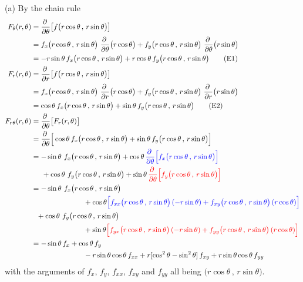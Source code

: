 \begin{solution}
(a) By the chain rule
\begin{align*}
F_\theta(r,\theta)
&=\pdiff{}{\theta}\big[f\big(r\cos\theta\,,\,r\sin\theta\big)\big] \\
&= f_x\big(r\cos\theta\,,\,r\sin\theta\big)
           \ \pdiff{}{\theta}\big(r\cos\theta\big)
  +f_y\big(r\cos\theta\,,\,r\sin\theta\big)
           \ \pdiff{}{\theta}\big(r\sin\theta\big)
   \\
&=-r\sin\theta\, f_x\big(r\cos\theta\,,\,r\sin\theta\big)
  +r\cos\theta\, f_y\big(r\cos\theta\,,\,r\sin\theta\big) 
\tag{E1}\\ %
F_r(r,\theta)
&=\pdiff{}{r}\big[f\big(r\cos\theta\,,\,r\sin\theta\big)\big] \\
&= f_x\big(r\cos\theta\,,\,r\sin\theta\big)
           \ \pdiff{}{r}\big(r\cos\theta\big)
  +f_y\big(r\cos\theta\,,\,r\sin\theta\big)
           \ \pdiff{}{r}\big(r\sin\theta\big)
   \\
&= \cos\theta\, f_x\big(r\cos\theta\,,\,r\sin\theta\big)
  +\sin\theta\, f_y\big(r\cos\theta\,,\,r\sin\theta\big) 
\tag{E2}\\ %
F_{r\theta}(r,\theta) &= \pdiff{}{\theta}\big[F_r(r,\theta)\big] \\
&=\pdiff{}{\theta}\Big[\cos\theta\, f_x\big(r\cos\theta\,,\,r\sin\theta\big)
  +\sin\theta\, f_y\big(r\cos\theta\,,\,r\sin\theta\big)\Big] \\
&=-\sin\theta\  f_x\big(r\cos\theta\,,\,r\sin\theta\big)
  +\cos\theta\, \textcolor{blue}{
          \pdiff{}{\theta} \Big[f_x\big(r\cos\theta\,,\,r\sin\theta\big)\Big]}
   \\&\hskip0.2in
  +\cos\theta\  f_y\big(r\cos\theta\,,\,r\sin\theta\big)
  +\sin\theta\,  \textcolor{red}{ 
       \pdiff{}{\theta}\Big[f_y\big(r\cos\theta\,,\,r\sin\theta\big)\Big]} \\
&=-\sin\theta\  f_x\big(r\cos\theta\,,\,r\sin\theta\big) \\&\hskip1in
    +\cos\theta \textcolor{blue}{
          \Big[f_{xx}\big(r\cos\theta\,,\,r\sin\theta\big)\,(-r\sin\theta)
              +f_{xy}\big(r\cos\theta\,,\,r\sin\theta\big)\,(r\cos\theta)\Big]}
          \\&\hskip0.1in
  +\cos\theta\  f_y\big(r\cos\theta\,,\,r\sin\theta\big) \\&\hskip1in
    +\sin\theta \textcolor{red}{
          \Big[f_{yx}\big(r\cos\theta\,,\,r\sin\theta\big)\,(-r\sin\theta)
              +f_{yy}\big(r\cos\theta\,,\,r\sin\theta\big)\,(r\cos\theta)\Big]}
          \\
&=-\sin\theta\, f_x
  +\cos\theta\, f_y \\&\hskip1in
  -r\sin\theta\cos\theta\, f_{xx}
  +r[\cos^2\theta-\sin^2\theta]\, f_{xy}
  +r\sin\theta\cos\theta\, f_{yy}
\end{align*}
with the arguments of $f_x$, $f_y$, $f_{xx}$, $f_{xy}$ and $f_{yy}$
all being $\big(r\cos\theta\,,\,r\sin\theta\big)$.


\end{solution}
